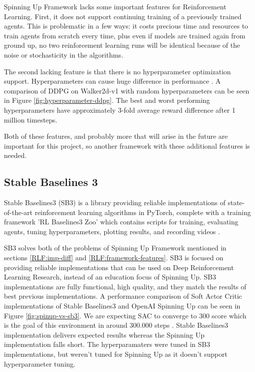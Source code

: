 \documentclass[12pt,twoside]{report}
\begin{document}
Spinning Up Framework lacks some important features for Reinforcement Learning. First, it does not support continuing training of a previously trained agents. This is problematic in a few ways: it costs precious time and resources to train agents from scratch every time, plus even if models are trained again from ground up, no two reinforcement learning runs will be identical because of the noise or stochasticity in the algorithms.

The second lacking feature is that there is no hyperparameter optimization support. Hyperparameters can cause huge difference in performance \cite{hyperparameter-ddpg}. A comparison of DDPG on Walker2d-v1 with random hyperparameters can be seen in Figure \ref{fig:hyperparameter-ddpg}. The best and worst performing hyperparameters have approximately 3-fold average reward difference after 1 million timesteps.

Both of these features, and probably more that will arise in the future are important for this project, so another framework with these additional features is needed.


\subsection{Stable Baselines 3}
Stable Baselines3 (SB3) is a library providing reliable implementations of state-of-the-art reinforcement learning algorithms in PyTorch, complete with a training framework 'RL Baselines3 Zoo' which contains scripts for training, evaluating agents, tuning hyperparameters, plotting results, and recording videos \cite{stable-baselines3}.

SB3 solves both of the problems of Spinning Up Framework mentioned in sections \ref{RLF:imp-diff} and \ref{RLF:framework-features}. SB3 is focused on providing reliable implementations that can be used on Deep Reinforcement Learning Research, instead of an education focus of Spinning Up. SB3 implementations are fully functional, high quality, and they match the results of best previous implementations. A performance comparison of Soft Actor Critic implementations of Stable Baselines3 and OpenAI Spinning Up can be seen in Figure \ref{fig:spinup-vs-sb3}. We are expecting SAC to converge to 300 score which is the goal of this environment \cite{Bipedal-Walker-v2} in around 300.000 steps \cite{gym-leaderboard}. Stable Baselines3 implementation delivers expected results whereas the Spinning Up implementation falls short. The hyperparamaters were tuned in SB3 implementations, but weren't tuned for Spinning Up as it doesn't support hyperparameter tuning.
\end{document}
